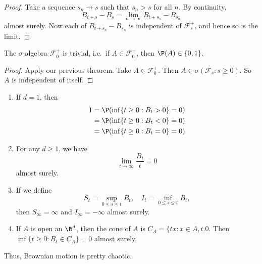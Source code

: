 \documentclass[a4paper]{article}
\begin{document}
\begin{proof}
  Take a sequence $s_n \to s$ such that $s_n > s$ for all $n$. By continuity,
  \[
    B_{t + s} - B_s = \lim_{n \to \infty} B_{t + s_n} - B_{s_n}
  \]
  almost surely. Now each of $B_{t + s_n} - B_{s_n}$ is independent of $\mathcal{F}_s^+$, and hence so is the limit.
%
\end{proof}

\begin{thm}
  The $\sigma$-algebra $\mathcal{F}^+_0$ is trivial, i.e.\ if $A \in \mathcal{F}_0^+$, then $\P(A) \in \{0, 1\}$.
\end{thm}

\begin{proof}
  Apply our previous theorem. Take $A \in \mathcal{F}_0^+$. Then $A \in \sigma (\mathcal{F}_s: s \geq 0)$. So $A$ is independent of itself.
\end{proof}

\begin{prop}\leavevmode
  \begin{enumerate}
    \item If $d = 1$, then
      \begin{align*}
        1 &= \P(\inf \{t \geq 0: B_t > 0\} = 0) \\
        &= \P (\inf \{t \geq 0: B_t < 0\} = 0) \\
        &= \P(\inf \{t \geq 0: B_t = 0\} = 0)
      \end{align*}
    \item For any $d \geq 1$, we have
      \[
        \lim_{t \to \infty} \frac{B_t}{t} = 0
      \]
      almost surely.
    \item If we define
      \[
        S_t = \sup_{0 \leq s \leq t} B_t,\quad I_t = \inf_{0 \leq s \leq t} B_t,
      \]
      then $S_\infty = \infty$ and $I_\infty = -\infty$ almost surely.
    \item If $A$ is open an $\R^d$, then the cone of $A$ is $C_A = \{tx: x \in A, t . 0$. Then $\inf \{t \geq 0: B_t \in C_A\} = 0$ almost surely.
  \end{enumerate}
\end{prop}
Thus, Brownian motion is pretty chaotic.
\end{document}
